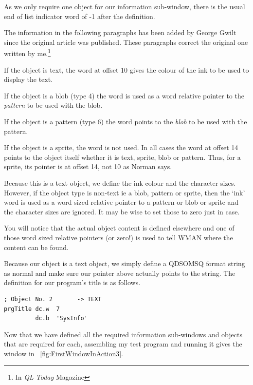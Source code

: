 As we only require one object for our information sub-{}window, there is the usual end
of list indicator word of -{}1 after the definition.

\begin{note}
The information in the following paragraphs has been added by George Gwilt since the original
article was published. These paragraphs correct the original one written by me.\footnote{In \emph{QL Today} Magazine}
\end{note}

If the object is text, the word at offset 10 gives the colour of the ink to be used to display the text. 

If the object is a blob (type 4) the word is used as a word relative pointer to the \emph{pattern} to be used with the blob.

If the object is a pattern (type 6) the word points to the \emph{blob} to be used with the
pattern. 

If the object is a sprite, the word is not used. In all cases the word at offset 14 points to the object itself
whether it is text, sprite, blob or pattern. Thus, for a sprite, its pointer is at offset 14, not 10 as Norman says.


Because this is a text object, we define the ink colour and the character sizes.
However, if the object type is non-{}text ie a blob, pattern or sprite, then the `ink' word
is used as a word sized relative pointer to a pattern or blob or sprite and the character
sizes are ignored. It may be wise to set those to zero just in case.

You will notice that the actual object content is defined elsewhere and one of those
word sized relative pointers (or zero!) is used to tell WMAN where the content can be
found.

Because our object is a text object, we simply define a QDSOMSQ format string as
normal and make sure our pointer above actually points to the string. The definition for
our program's title is as follows.

\begin{lstlisting}[firstnumber=last,caption={WMAN Example Window - Information Object Text}]
; Object No. 2       -> TEXT  
prgTitle dc.w  7
         dc.b  'SysInfo'
\end{lstlisting}

Now that we have defined all the required information sub-{}windows and objects that
are required for each, assembling my test program and running it gives the window in \figurename~\ref{fig:FirstWindowInAction3}.

